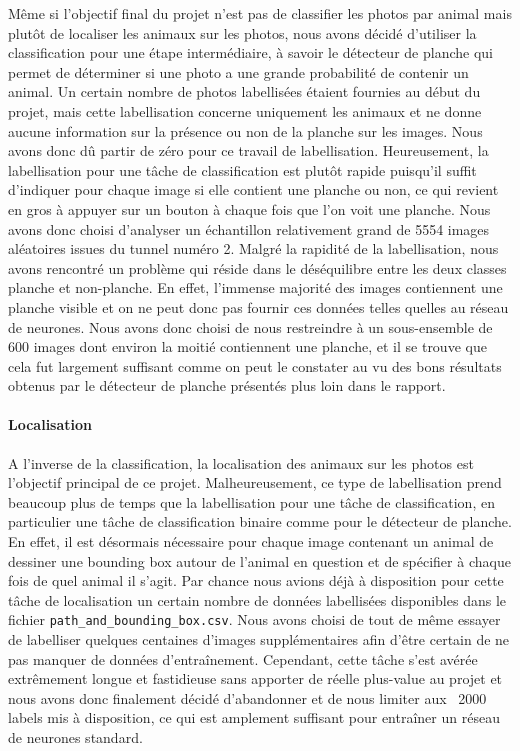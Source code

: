 Même si l'objectif final du projet n'est pas de classifier les photos par animal mais plutôt de localiser les animaux sur les photos, nous avons décidé d'utiliser la classification pour une étape intermédiaire, à savoir le détecteur de planche qui permet de déterminer si une photo a une grande probabilité de contenir un animal. Un certain nombre de photos labellisées étaient fournies au début du projet, mais cette labellisation concerne uniquement les animaux et ne donne aucune information sur la présence ou non de la planche sur les images. Nous avons donc dû partir de zéro pour ce travail de labellisation. Heureusement, la labellisation pour une tâche de classification est plutôt rapide puisqu'il suffit d'indiquer pour chaque image si elle contient une planche ou non, ce qui revient en gros à appuyer sur un bouton à chaque fois que l'on voit une planche. Nous avons donc choisi d'analyser un échantillon relativement grand de 5554 images aléatoires issues du tunnel numéro 2. Malgré la rapidité de la labellisation, nous avons rencontré un problème qui réside dans le déséquilibre entre les deux classes planche et non-planche. En effet, l'immense majorité des images contiennent une planche visible et on ne peut donc pas fournir ces données telles quelles au réseau de neurones. Nous avons donc choisi de nous restreindre à un sous-ensemble de 600 images dont environ la moitié contiennent une planche, et il se trouve que cela fut largement suffisant comme on peut le constater au vu des bons résultats obtenus par le détecteur de planche présentés plus loin dans le rapport.

\paragraph{Localisation}

A l'inverse de la classification, la localisation des animaux sur les photos est l'objectif principal de ce projet. Malheureusement, ce type de labellisation prend beaucoup plus de temps que la labellisation pour une tâche de classification, en particulier une tâche de classification binaire comme pour le détecteur de planche. En effet, il est désormais nécessaire pour chaque image contenant un animal de dessiner une bounding box autour de l'animal en question et de spécifier à chaque fois de quel animal il s'agit. Par chance nous avions déjà à disposition pour cette tâche de localisation un certain nombre de données labellisées disponibles dans le fichier \verb|path_and_bounding_box.csv|. Nous avons choisi de tout de même essayer de labelliser quelques centaines d'images supplémentaires afin d'être certain de ne pas manquer de données d'entraînement. Cependant, cette tâche s'est avérée extrêmement longue et fastidieuse sans apporter de réelle plus-value au projet et nous avons donc finalement décidé d'abandonner et de nous limiter aux ~2000 labels mis à disposition, ce qui est amplement suffisant pour entraîner un réseau de neurones standard. 
